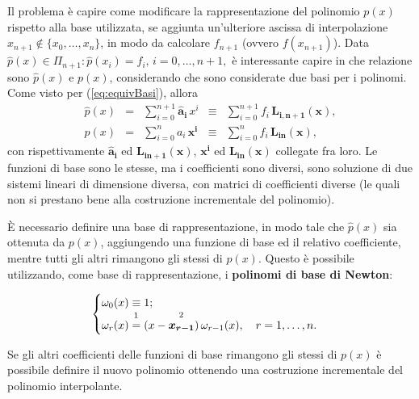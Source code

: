 Il problema è capire come modificare la rappresentazione del polinomio $p(x)$ rispetto alla base utilizzata, se aggiunta un'ulteriore ascissa di interpolazione $x_{n+1}\notin\{x_0,\hdots,x_n\}$, in modo da calcolare $f_{n+1}$ (ovvero $f(x_{n+1})$). Data $\widehat{p}(x)\in\Pi_{n+1}:\widehat{p}(x_i)=f_i,\, i=0,\hdots,n+1,$ è interessante capire in che relazione sono $\widehat{p}(x)$ e $p(x)$, considerando che sono considerate due basi per i polinomi. Come visto per (\ref{eq:equivBasi}), allora
\begin{equation}
    \begin{matrix}
         \widehat{p}(x)&=&\sum_{i=0}^{n+1}\boldsymbol{\widehat{a}_i}\, x^i&\equiv&\sum_{i=0}^{n+1} f_i\, \boldsymbol{L_{i,n+1}(x)},\\
        p(x)&=&\sum_{i=0}^n a_i\,\boldsymbol{x^i}&\equiv&\sum_{i=0}^n f_i\, \boldsymbol{L_{in}(x)},
    \end{matrix}
\end{equation}
con rispettivamente $\boldsymbol{\widehat{a}_i}$ ed $\boldsymbol{L_{in+1}(x)}$, $\boldsymbol{x^i}$ ed $\boldsymbol{L_{in}(x)}$ collegate fra loro.
Le funzioni di base sono le stesse, ma i coefficienti sono diversi, sono soluzione di due sistemi lineari di dimensione diversa, con matrici di coefficienti diverse (le quali non si prestano bene alla costruzione incrementale del polinomio). 

È necessario definire una base di rappresentazione, in modo tale che $\widehat p(x)$ sia ottenuta da $p(x)$, aggiungendo una funzione di base ed il relativo coefficiente, mentre tutti gli altri rimangono gli stessi di $p(x)$. Questo è possibile utilizzando, come base di rappresentazione, i \textbf{polinomi di base di Newton}:

\begin{equation}\label{eq:polBaseNewt}
    \begin{cases}
        \omega_0(x)\equiv 1;\\
        \omega_r(x)\overset{\footnotemark}{=}(x-\overset{\footnotemark}{\boldsymbol{x_{r-1}}})\,\omega_{r-1}(x),\quad r=1,\hdots,n.
    \end{cases}
\end{equation}
\addtocounter{footnote}{-1}


Se gli altri coefficienti delle funzioni di base rimangono gli stessi di $p(x)$ è possibile definire il nuovo polinomio ottenendo una costruzione incrementale del polinomio interpolante.

